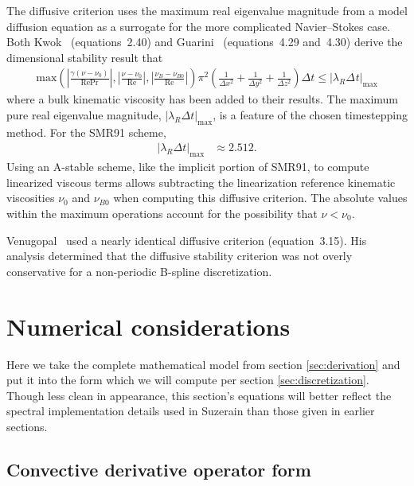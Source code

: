 \documentclass[letterpaper,11pt,nointlimits,reqno,draft]{amsart}
\begin{document}
The diffusive criterion uses the maximum real eigenvalue magnitude from a model
diffusion equation as a surrogate for the more complicated Navier--Stokes case.
Both Kwok~\cite{Kwok2002} (equations~2.40) and Guarini~\cite{Guarini1998}
(equations~4.29 and~4.30) derive the dimensional stability result that
\begin{align}\label{eq:diffusivestability}
    \mbox{max}\!\left(
      \left|\frac{\gamma\left(\nu-\nu_{0}\right)}{\mbox{Re}\mbox{Pr}}\right|,
      \left|\frac{\nu-\nu_{0}}{\mbox{Re}}\right|,
      \left|\frac{\nu_{B}-\nu_{B0}}{\mbox{Re}}\right|
    \right)
    \pi^{2}
    \left(
        \frac{1}{\Delta{}x^{2}}
      + \frac{1}{\Delta{}y^{2}}
      + \frac{1}{\Delta{}z^{2}}
    \right)
    \Delta{}t \leq \left|\lambda_{R}\Delta_{}t\right|_{\mbox{max}}
\end{align}
where a bulk kinematic viscosity has been added to their results.  The maximum
pure real eigenvalue magnitude,
$\left|\lambda_{R}\Delta{}t\right|_{\mbox{max}}$, is a feature of the chosen
timestepping method.  For the SMR91 scheme,
\begin{align}
\left|\lambda_{R}\Delta{}t\right|_{\mbox{max}} &\approx 2.512.
\end{align}
Using an A-stable scheme, like the implicit portion of SMR91, to compute
linearized viscous terms allows subtracting the linearization reference
kinematic viscosities $\nu_0$ and $\nu_{B0}$ when computing this diffusive
criterion.  The absolute values within the maximum operations account for the
possibility that $\nu<\nu_{0}$.

Venugopal~\cite{Venugopal2003} used a nearly identical diffusive criterion
(equation~3.15).  His analysis determined that the diffusive stability
criterion was not overly conservative for a non-periodic B-spline
discretization.

\section{Numerical considerations}

Here we take the complete mathematical model from section \ref{sec:derivation}
and put it into the form which we will compute per section
\ref{sec:discretization}.  Though less clean in appearance, this section's
equations will better reflect the spectral implementation details used in
Suzerain than those given in earlier sections.

\subsection{Convective derivative operator form}
\end{document}
